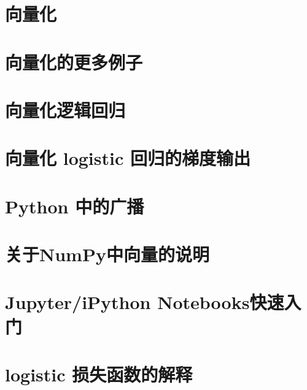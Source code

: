 \documentclass[../../main.tex]{subfiles}
\begin{document}
\section{向量化}

\section{向量化的更多例子}

\section{向量化逻辑回归}

\section{向量化 logistic 回归的梯度输出}

\section{Python 中的广播}

\section{关于NumPy中向量的说明}

\section{Jupyter/iPython Notebooks快速入门}

\section{logistic 损失函数的解释}
\end{document}
